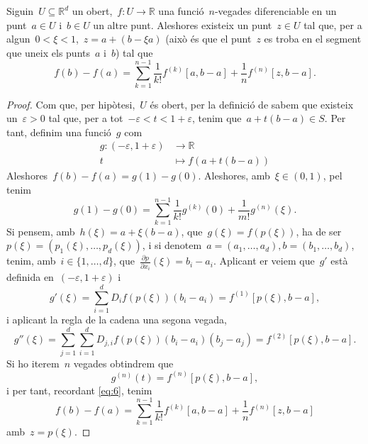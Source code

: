 \documentclass[../../main.tex]{subfiles}
\begin{document}
    \begin{theorem}
        \label{thm:Formula de Taylor multivariable}
        Siguin~\(U\subseteq\mathbb{R}^{d}\) un obert,~\(f\colon U\to\mathbb{R}\) una funció~\(n\)-vegades diferenciable en un punt~\(a\in U\) i~\(b\in U\) un altre punt.
        Aleshores existeix un punt~\(z\in U\) tal que, per a algun~\(0<\xi<1\),~\(z=a+(b-\xi a)\) (això és que el punt~\(z\) es troba en el segment que uneix els punts~\(a\) i~\(b\)) tal que
        \[
            f(b)-f(a)=\sum_{k=1}^{n-1}\frac{1}{k!}f^{(k)}[a,b-a]+\frac{1}{n}f^{(n)}[z,b-a].
        \]
        \begin{proof}
            Com que, per hipòtesi,~\(U\) és obert, per la definició de  sabem que existeix un~\(\varepsilon>0\) tal que, per a tot~\(-\varepsilon<t<1+\varepsilon\), tenim que~\(a+t(b-a)\in S\).
            Per tant, definim una funció~\(g\) com
            \begin{align*}
            g\colon(-\varepsilon,1+\varepsilon)&\to\mathbb{R}\\
            t&\mapsto f(a+t(b-a))
            \end{align*}
            Aleshores~\(f(b)-f(a)=g(1)-g(0)\).
            Aleshores, amb~\(\xi\in(0,1)\), pel  tenim
            \begin{equation}\label{eq:6}
            g(1)-g(0)=\sum_{k=1}^{n-1}\frac{1}{k!}g^{(k)}(0)+\frac{1}{m!}g^{(n)}(\xi).
            \end{equation}
            Si pensem, amb~\(h(\xi)=a+\xi(b-a)\), que~\(g(\xi)=f(p(\xi))\), ha de ser~\(p(\xi)=(p_{1}(\xi),\dots,p_{d}(\xi))\), i si denotem~\(a=(a_{1},\dots,a_{d}),b=(b_{1},\dots,b_{d})\), tenim, amb~\(i\in\{1,\dots,d\}\), que~\(\frac{\partial p}{\partial x_{i}}(\xi)=b_{i}-a_{i}\).
            Aplicant er  veiem que~\(g'\) està definida en~\((-\varepsilon,1+\varepsilon)\) i
            \[
                g'(\xi)=\sum_{i=1}^{d}D_{i}f(p(\xi))(b_{i}-a_{i})=f^{(1)}[p(\xi),b-a],
            \]
            i aplicant la regla de la cadena una segona vegada,
            \[
                g''(\xi)=\sum_{j=1}^{d}\sum_{i=1}^{d}D_{j,i}f(p(\xi))(b_{i}-a_{i})(b_{j}-a_{j})=f^{(2)}[p(\xi),b-a].
            \]
            Si ho iterem~\(n\) vegades obtindrem que
            \[
                g^{(n)}(t)=f^{(n)}[p(\xi),b-a],
            \]
            i per tant, recordant \eqref{eq:6}, tenim
            \[
                f(b)-f(a)=\sum_{k=1}^{n-1}\frac{1}{k!}f^{(k)}[a,b-a]+\frac{1}{n}f^{(n)}[z,b-a]
            \]
            amb~\(z=p(\xi)\).
        \end{proof}
    \end{theorem}
\end{document}
